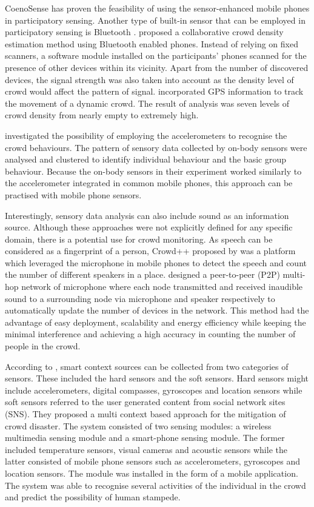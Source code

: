 CoenoSense has proven the feasibility of using the sensor-enhanced mobile phones in participatory sensing. Another type of built-in sensor that can be employed in participatory sensing is Bluetooth \citep{Stopczynski2013,Weppner2011,Weppner2013}. \citet{Weppner2011} proposed a collaborative crowd density estimation method using Bluetooth enabled phones. Instead of relying on fixed scanners, a software module installed on the participants’ phones scanned for the presence of other devices within its vicinity. Apart from the number of discovered devices, the signal strength was also taken into account as the density level of crowd would affect the pattern of signal. \citet{Weppner2013} incorporated GPS information to track the movement of a dynamic crowd. The result of analysis was seven levels of crowd density from nearly empty to extremely high.

\citet{Roggen2011} investigated the possibility of employing the accelerometers to recognise the crowd behaviours. The pattern of sensory data collected by on-body sensors were analysed and clustered to identify individual behaviour and the basic group behaviour. Because the on-body sensors in their experiment worked similarly to the accelerometer integrated in common mobile phones, this approach can be practised with mobile phone sensors.

Interestingly, sensory data analysis can also include sound as an information source. Although these approaches were not explicitly defined for any specific domain, there is a potential use for crowd monitoring. As speech can be considered as a fingerprint of a person, Crowd++ proposed by \citet{Xu2013} was a platform which leveraged the microphone in mobile phones to detect the speech and count the number of different speakers in a place. \citet{Kannan2012} designed a peer-to-peer (P2P) multi-hop network of microphone where each node transmitted and received inaudible sound to a surrounding node via microphone and speaker respectively to automatically update the number of devices in the network. This method had the advantage of easy deployment, scalability and energy efficiency while keeping the minimal interference and achieving a high accuracy in counting the number of people in the crowd.

According to \citet{Ramesh2014}, smart context sources can be collected from two categories of sensors. These included the hard sensors and the soft sensors. Hard sensors might include accelerometers, digital compasses, gyroscopes and location sensors while soft sensors referred to the user generated content from social network sites (SNS). They proposed a multi context based approach for the mitigation of crowd disaster. The system consisted of two sensing modules: a wireless multimedia sensing module and a smart-phone sensing module. The former included temperature sensors, visual cameras and acoustic sensors while the latter consisted of mobile phone sensors such as accelerometers, gyroscopes and location sensors. The module was installed in the form of a mobile application. The system was able to recognise several activities of the individual in the crowd and predict the possibility of human stampede.

